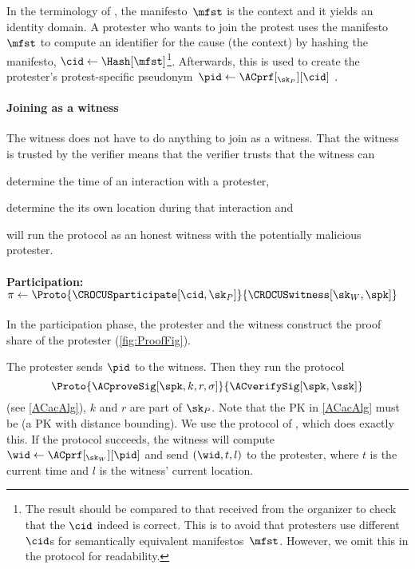 In the terminology of \textcite{SelfCertifiedSybilFreePseudonyms}, the 
manifesto~\(\mfst\) is the context and it yields an identity domain.
A protester who wants to join the protest uses the manifesto~\(\mfst\) to
compute an identifier for the cause (the context) by hashing the manifesto,
\(\cid\gets \Hash[\mfst]\)\footnote{%
  The result should be compared to that received from the organizer to check 
  that the \(\cid\) indeed is correct.
  This is to avoid that protesters use different \(\cid\)s for semantically 
  equivalent manifestos~\(\mfst\).
  However, we omit this in the protocol for readability.
}.
Afterwards, this is used to create the protester's protest-specific 
pseudonym~\(\pid\gets \ACprf[_{\sk_P}][\cid]\)%
.


\paragraph*{Joining as a witness}

The witness does not have to do anything to join as a witness.
That the witness is trusted by the verifier means that the verifier trusts that 
the witness can
\begin{enumerate*}
  \item determine the time of an interaction with a protester,
  \item determine the its own location during that interaction
    and
  \item will run the protocol as an honest witness with the potentially 
    malicious protester.
\end{enumerate*}


\paragraph*{Participation:
  \(\pi\gets
    \Proto{\CROCUSparticipate[\cid, \sk_P]}{\CROCUSwitness[\sk_W, \spk]}\)}

In the participation phase, the protester and 
the witness construct the proof share of the protester (\cref{fig:ProofFig}).

The protester sends \(\pid\) to the witness.
Then they run the protocol \[
  \Proto{\ACproveSig[\spk, k, r, \sigma]}{\ACverifySig[\spk, \ssk]}
\] (see \cref{ACacAlg}), \(k\) and \(r\) are part of \(\sk_P\).
Note that the \acf{PK} in \cref{ACacAlg} must be
 (\ie a \acl{PK} with distance bounding).
We use the protocol of \textcite{DB-Schnorr}, which does exactly this.
If the protocol succeeds, the witness will compute \(\wid \gets 
\ACprf[_{\sk_W}][\pid]\) and send \((\wid, t, l)\) to the protester, where 
\(t\) is the current time and \(l\) is the witness' current location.


